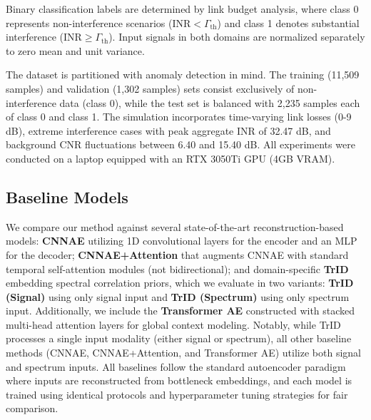 \documentclass[conference]{IEEEtran}
\begin{document}
Binary classification labels are determined by link budget analysis, where class 0 represents non-interference scenarios ($\text{INR} < \Gamma_{\text{th}}$) and class 1 denotes substantial interference ($\text{INR} \geq \Gamma_{\text{th}}$). Input signals in both domains are normalized separately to zero mean and unit variance.

The dataset is partitioned with anomaly detection in mind. The training (11,509 samples) and validation (1,302 samples) sets consist exclusively of non-interference data (class 0), while the test set is balanced with 2,235 samples each of class 0 and class 1. The simulation incorporates time-varying link losses (0-9 dB), extreme interference cases with peak aggregate INR of 32.47 dB, and background CNR fluctuations between 6.40 and 15.40 dB. All experiments were conducted on a laptop equipped with an RTX 3050Ti GPU (4GB VRAM).




\subsection{Baseline Models}

We compare our method against several state-of-the-art reconstruction-based models: \textbf{CNNAE} utilizing 1D convolutional layers for the encoder and an MLP for the decoder; \textbf{CNNAE+Attention} that augments CNNAE with standard temporal self-attention modules (not bidirectional); and domain-specific \textbf{TrID} \cite{saifaldawlaGenAIBasedModelsNGSO2024} embedding spectral correlation priors, which we evaluate in two variants: \textbf{TrID (Signal)} using only signal input and \textbf{TrID (Spectrum)} using only spectrum input. Additionally, we include the \textbf{Transformer AE} constructed with stacked multi-head attention layers for global context modeling. Notably, while TrID processes a single input modality (either signal or spectrum), all other baseline methods (CNNAE, CNNAE+Attention, and Transformer AE) utilize both signal and spectrum inputs. All baselines follow the standard autoencoder paradigm where inputs are reconstructed from bottleneck embeddings, and each model is trained using identical protocols and hyperparameter tuning strategies for fair comparison.
\end{document}
